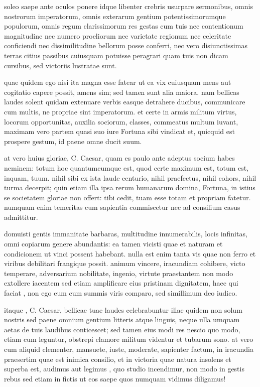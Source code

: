  soleo saepe ante oculos ponere idque libenter crebris usurpare sermonibus, omnis nostrorum imperatorum, omnis exterarum gentium potentissimorumque populorum, omnis regum clarissimorum res gestas cum tuis nec contentionum magnitudine nec numero proeliorum nec varietate regionum nec celeritate conficiendi nec dissimilitudine bellorum posse conferri, nec vero disiunctissimas terras citius passibus cuiusquam potuisse peragrari quam tuis non dicam cursibus, sed victoriis lustratae sunt.

 quae quidem ego nisi ita magna esse fatear ut ea vix cuiusquam mens aut cogitatio capere possit, amens sim; sed tamen sunt alia maiora. nam bellicas laudes solent quidam extenuare verbis easque detrahere ducibus, communicare cum multis, ne propriae sint imperatorum. et certe in armis militum virtus, locorum opportunitas, auxilia sociorum, classes, commeatus multum iuvant, maximam vero partem quasi suo iure Fortuna sibi vindicat et, quicquid est prospere gestum, id paene omne ducit suum.

 at vero huius gloriae, C. Caesar, quam es paulo ante adeptus socium habes neminem: totum hoc quantumcumque est, quod certe maximum est, totum est, inquam, tuum. nihil sibi ex ista laude centurio, nihil praefectus, nihil cohors, nihil turma decerpit; quin etiam illa ipsa rerum humanarum domina, Fortuna, in istius se societatem gloriae non offert: tibi cedit, tuam esse totam et propriam fatetur. numquam enim temeritas cum sapientia commiscetur nec ad consilium casus admittitur.

 domuisti gentis immanitate barbaras, multitudine innumerabilis, locis infinitas, omni copiarum genere abundantis: ea tamen vicisti quae et naturam et condicionem ut vinci possent habebant. nulla est enim tanta vis quae non ferro et viribus debilitari frangique possit. animum vincere, iracundiam cohibere, victo temperare, adversarium nobilitate, ingenio, virtute praestantem non modo extollere iacentem sed etiam amplificare eius pristinam dignitatem, haec qui faciat , non ego eum cum summis viris comparo, sed simillimum deo iudico.

 itaque , C. Caesar, bellicae tuae laudes celebrabuntur illae quidem non solum nostris sed paene omnium gentium litteris atque linguis, neque ulla umquam aetas de tuis laudibus conticescet; sed tamen eius modi res nescio quo modo, etiam cum leguntur, obstrepi clamore militum videntur et tubarum sono. at vero cum aliquid clementer, mansuete, iuste, moderate, sapienter factum, in iracundia praesertim quae est inimica consilio, et in victoria quae natura insolens et superba est, audimus aut legimus , quo studio incendimur, non modo in gestis rebus sed etiam in fictis ut eos saepe quos numquam vidimus diligamus!

